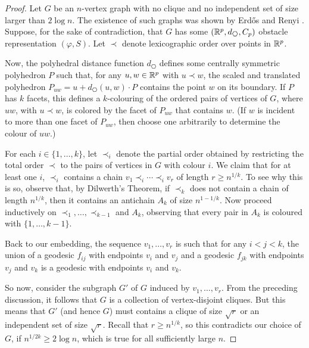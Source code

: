 \documentclass{patmorin}
\begin{document}
\begin{proof}
  Let $G$ be an $n$-vertex graph with no clique and no independent set of
  size larger than $2\log n$. The existence of such graphs was shown by
  Erd\H{o}s and Renyi \cite{X}. Suppose, for the sake of contradiction,
  that $G$ has some $(\R^p, d_{\hexagon}, C_p)$ obstacle representation
  $(\varphi,S)$. Let $\prec$ denote lexicographic order over points
  in $\mathbb{R}^{p}$.

  Now, the polyhedral distance function $d_{\hexagon}$ defines some
  centrally symmetric polyhedron $P$ such that, for any $u,w\in
  \mathbb{R}^p$ with $u\prec w$, the scaled and translated polyhedron
  $P_{uw}=u+d_{\hexagon}(u,w)\cdot P$ contains the point $w$ on its
  boundary.  If $P$ has $k$ facets, this defines a $k$-colouring of
  the ordered pairs of vertices of $G$, where $uw$, with $u\prec w$,
  is colored by the facet of $P_{uw}$ that contains $w$.  (If $w$
  is incident to more than one facet of $P_{uw}$, then choose one arbitrarily to
  determine the colour of $uw$.)

  For each $i\in\{1,\ldots,k\}$, let $\prec_i$ denote the partial
  order obtained by restricting the total order $\prec$ to the pairs of
  vertices in $G$ with colour $i$.  We claim that for at least one $i$,
  $\prec_i$ contains a chain $v_1\prec_i\cdots\prec_i v_r$ of length
  $r\ge n^{1/k}$.  To see why this is so, observe that, by Dilwerth's
  Theorem, if $\prec_k$ does not contain a chain of length $n^{1/k}$,
  then it contains an antichain $A_k$ of size $n^{1-1/k}$.  Now proceed
  inductively on $\prec_1,\ldots,\prec_{k-1}$ and $A_k$, observing that
  every pair in $A_k$ is coloured with $\{1,\ldots,k-1\}$.

  Back to our embedding, the sequence $v_1,\ldots,v_r$ is such that for
  any $i<j<k$, the union of a geodesic $f_{ij}$ with endpoints $v_i$
  and $v_j$ and a geodesic $f_{jk}$ with endpoints $v_j$ and $v_k$
  is a geodesic with endpoints $v_i$ and $v_k$.
  
  So now, consider the subgraph $G'$ of $G$ induced by
  $v_1,\ldots,v_r$. From the preceding discussion, it follows that $G$
  is a collection of vertex-disjoint cliques.  But this means that
  $G'$ (and hence $G$) must contains a clique of size $\sqrt{r}$ or
  an independent set of size $\sqrt{r}$.  Recall that $r\ge
  n^{1/k}$, so this contradicts our choice of $G$, if $n^{1/2k} \ge
  2\log n$, which is true for all sufficiently large $n$.
\end{proof}
\end{document}
